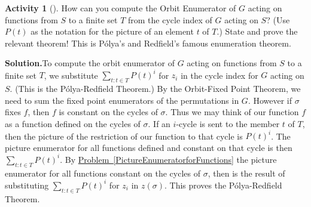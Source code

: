 \documentclass[10pt,]{book}
\theoremstyle{plain}
\theoremstyle{definition}
\newtheorem{activity}[project]{Activity}
\numberwithin{equation}{chapter}
\begin{document}
\begin{activity}[]\label{activity-327}
How can you compute the Orbit Enumerator of \(G\) acting on functions from \(S\) to a finite set \(T\) from the cycle index of \(G\) acting on \(S\)? (Use \(P(t)\) as the notation for the picture of an element \(t\) of \(T\).) State and prove the relevant theorem! This is Pólya's and Redfield's famous enumeration theorem.%
\par\medskip\noindent%
\textbf{Solution.}\quad To compute the orbit enumerator of \(G\) acting on functions from \(S\) to a finite set \(T\), we substitute \(\sum_{t:t\in T}P(t)^i\) for \(z_i\) in the cycle index for \(G\) acting on \(S\). (This is the Pólya-Redfield Theorem.) By the Orbit-Fixed Point Theorem, we need to sum the fixed point enumerators of the permutations in \(G\). However if \(\sigma\) fixes \(f\), then \(f\) is constant on the cycles of \(\sigma\). Thus we may think of our function \(f\) as a function defined on the cycles of \(\sigma\). If an \(i\)-cycle is sent to the member \(t\) of \(T\), then the picture of the restriction of our function to that cycle is \(P(t)^i\). The picture enumerator for all functions defined and constant on that cycle is then \(\sum_{t:t\in T} P(t)^i\). By \hyperref[PictureEnumeratorforFunctions]{Problem~\ref{PictureEnumeratorforFunctions}} the picture enumerator for all functions constant on the cycles of \(\sigma\), then is the result of substituting \(\sum_{t:t\in T}P(t)^i\) for \(z_i\) in \(z(\sigma)\). This proves the Pólya-Redfield Theorem.%
\end{activity}
\end{document}
